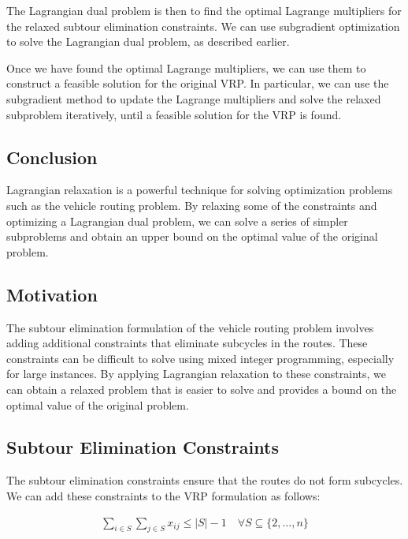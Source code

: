 The Lagrangian dual problem is then to find the optimal Lagrange multipliers for the relaxed subtour elimination constraints. We can use subgradient optimization to solve the Lagrangian dual problem, as described earlier.

Once we have found the optimal Lagrange multipliers, we can use them to construct a feasible solution for the original VRP. In particular, we can use the subgradient method to update the Lagrange multipliers and solve the relaxed subproblem iteratively, until a feasible solution for the VRP is found.

\subsection{Conclusion}

Lagrangian relaxation is a powerful technique for solving optimization problems such as the vehicle routing problem. By relaxing some of the constraints and optimizing a Lagrangian dual problem, we can solve a series of simpler subproblems and obtain an upper bound on the optimal value of the original problem.



\subsection{Motivation}

The subtour elimination formulation of the vehicle routing problem involves adding additional constraints that eliminate subcycles in the routes. These constraints can be difficult to solve using mixed integer programming, especially for large instances. By applying Lagrangian relaxation to these constraints, we can obtain a relaxed problem that is easier to solve and provides a bound on the optimal value of the original problem.

\subsection{Subtour Elimination Constraints}

The subtour elimination constraints ensure that the routes do not form subcycles. We can add these constraints to the VRP formulation as follows:

\begin{align*}
\sum_{i \in S} \sum_{j \in S} x_{ij} \leq |S| - 1 \quad \forall S \subseteq \{2,\dots,n\}
\end{align*}

